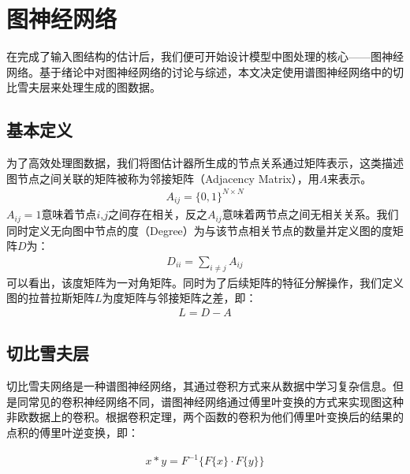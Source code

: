 \section{图神经网络}
在完成了输入图结构的估计后，我们便可开始设计模型中图处理的核心——图神经网络。基于绪论中对图神经网络的讨论与综述，本文决定使用谱图神经网络中的切比雪夫层来处理生成的图数据。

\subsection{基本定义}

为了高效处理图数据，我们将图估计器所生成的节点关系通过矩阵表示，这类描述图节点之间关联的矩阵被称为邻接矩阵（Adjacency Matrix），用$A$来表示。
\begin{equation}\begin{aligned}
A_{ij}=\{0,1\}^{N\times N}
\end{aligned}\end{equation}
$A_{ij}=1$意味着节点$i$,$j$之间存在相关，反之$A_{ij}$意味着两节点之间无相关关系。我们同时定义无向图中节点的度（Degree）为与该节点相关节点的数量并定义图的度矩阵$D$为：
\begin{equation}\begin{aligned}
D_{ii}=\sum_{i\neq j}A_{ij}
\end{aligned}\end{equation}
可以看出，该度矩阵为一对角矩阵。同时为了后续矩阵的特征分解操作，我们定义图的拉普拉斯矩阵$L$为度矩阵与邻接矩阵之差，即：
\begin{equation}\begin{aligned}
L=D-A
\end{aligned}\end{equation}
\subsection{切比雪夫层}

切比雪夫网络是一种谱图神经网络，其通过卷积方式来从数据中学习复杂信息\cite{proakis_digital_1996}。但是同常见的卷积神经网络不同，谱图神经网络通过傅里叶变换的方式来实现图这种非欧数据上的卷积。根据卷积定理\cite{stahlschmidt_multimodal_2022}，两个函数的卷积为他们傅里叶变换后的结果的点积的傅里叶逆变换，即：

\begin{equation}\begin{aligned}
x * y=F^{-1}\{F\{x\}\cdot F\{y\} \}
\end{aligned}\end{equation}


